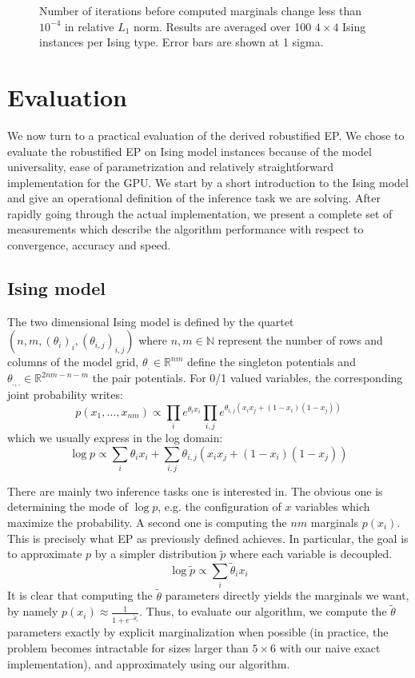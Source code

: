 \documentclass[times, 10pt,twocolumn]{article}
\begin{document}
\begin{figure}[h!]
	\caption{Number of iterations before computed marginals change less than $10^{-4}$ in relative $L_1$ norm. Results are averaged over 100 $4 \times 4$ Ising instances per Ising type. Error bars are shown at 1 sigma.}
	\label{44conv}
\end{figure}
\section{Evaluation}
We now turn to a practical evaluation of the derived robustified EP. We chose to evaluate the robustified EP on Ising model instances because of the model universality, ease of parametrization and relatively straightforward implementation for the GPU. We start by a short introduction to the Ising model and give an operational definition of the inference task we are solving. After rapidly going through the actual implementation, we present a complete set of measurements which describe the algorithm performance with respect to convergence, accuracy and speed.

\subsection{Ising model}
The two dimensional Ising model is defined by the quartet $(n, m, (\theta_i)_i, (\theta_{i,j})_{i,j})$ where $n, m \in \mathbb{N}$ represent the number of rows and columns of the model grid, $\theta_. \in \mathbb{R}^{nm}$ define the singleton potentials and $\theta_{.,.} \in \mathbb{R}^{2nm-n-m}$ the pair potentials. For 0/1 valued variables, the corresponding joint probability writes:
\[
	p(x_1,\dots,x_{nm}) \propto \prod_i e^{\theta_i x_i} \prod_{i,j} e^{\theta_{i,j} (x_i x_j + (1-x_i)(1-x_j))}
\]
which we usually express in the log domain:
\[
	\log p \propto \sum_i \theta_i x_i + \sum_{i,j} \theta_{i,j} (x_i x_j + (1-x_i)(1-x_j))
\]

There are mainly two inference tasks one is interested in. The obvious one is determining the mode of $\log p$, e.g. the configuration of $x$ variables which maximize the probability. A second one is computing the $nm$ marginals $p(x_i)$. This is precisely what EP as previously defined achieves. In particular, the goal is to approximate $p$ by a simpler distribution $\tilde p$ where each variable is decoupled. 
\[
	\log \tilde p \propto \sum_i \tilde \theta_i x_i
\]
It is clear that computing the $\tilde \theta$ parameters directly yields the marginals we want, by namely $p(x_i) \approx \frac{1}{1+e^{-\tilde \theta_i}}$. Thus, to evaluate our algorithm, we compute the $\tilde \theta$ parameters exactly by explicit marginalization when possible (in practice, the problem becomes intractable for sizes larger than $5 \times 6$ with our naive exact implementation), and approximately using our algorithm.
\end{document}
